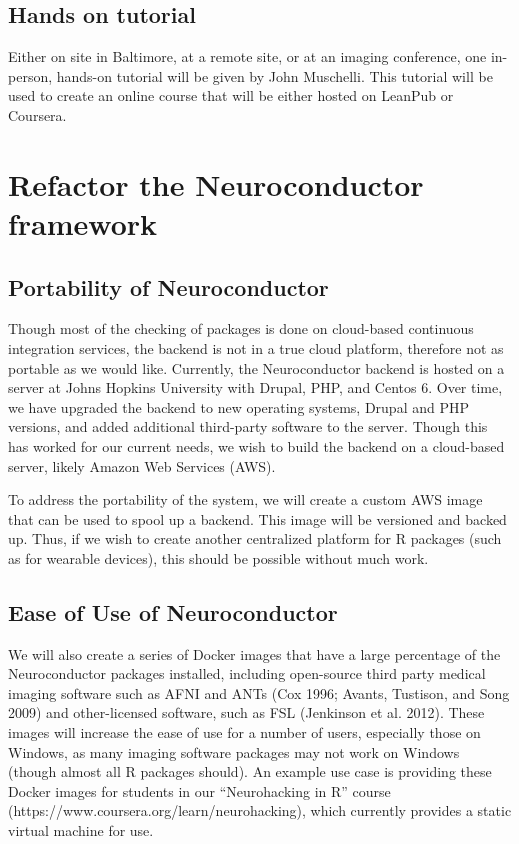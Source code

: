 \documentclass[]{elsarticle} %
\begin{document}
\hypertarget{hands-on-tutorial}{%
\subsection{Hands on tutorial}\label{hands-on-tutorial}}

Either on site in Baltimore, at a remote site, or at an imaging conference, one in-person, hands-on tutorial will be given by John Muschelli. This tutorial will be used to create an online course that will be either hosted on LeanPub or Coursera.

\hypertarget{refactor-the-neuroconductor-framework}{%
\section{Refactor the Neuroconductor framework}\label{refactor-the-neuroconductor-framework}}

\hypertarget{portability-of-neuroconductor}{%
\subsection{Portability of Neuroconductor}\label{portability-of-neuroconductor}}

Though most of the checking of packages is done on cloud-based continuous integration services, the backend is not in a true cloud platform, therefore not as portable as we would like. Currently, the Neuroconductor backend is hosted on a server at Johns Hopkins University with Drupal, PHP, and Centos 6. Over time, we have upgraded the backend to new operating systems, Drupal and PHP versions, and added additional third-party software to the server. Though this has worked for our current needs, we wish to build the backend on a cloud-based server, likely Amazon Web Services (AWS).

To address the portability of the system, we will create a custom AWS image that can be used to spool up a backend. This image will be versioned and backed up. Thus, if we wish to create another centralized platform for R packages (such as for wearable devices), this should be possible without much work.

\hypertarget{ease-of-use-of-neuroconductor}{%
\subsection{Ease of Use of Neuroconductor}\label{ease-of-use-of-neuroconductor}}

We will also create a series of Docker images that have a large percentage of the Neuroconductor packages installed, including open-source third party medical imaging software such as AFNI and ANTs (Cox 1996; Avants, Tustison, and Song 2009) and other-licensed software, such as FSL (Jenkinson et al. 2012). These images will increase the ease of use for a number of users, especially those on Windows, as many imaging software packages may not work on Windows (though almost all R packages should). An example use case is providing these Docker images for students in our ``Neurohacking in R'' course (https://www.coursera.org/learn/neurohacking), which currently provides a static virtual machine for use.
\end{document}
